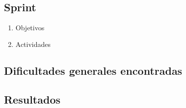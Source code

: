    \subsection{Sprint}
    \begin{enumerate}
        \item Objetivos
        \item Actividades
    \end{enumerate}
        
        
    \subsection{Dificultades generales encontradas}
    \subsection{Resultados}
\pagebreak